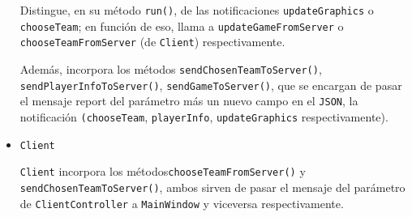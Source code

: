 \documentclass[../DocumentoOficial.tex]{subfiles}
\begin{document}
\begin{sprint}[6]
\begin{itemize}
Distingue, en su método \texttt{run()}, de las notificaciones \texttt{updateGraphics} o \texttt{chooseTeam}; en función de eso, llama a \texttt{updateGameFromServer} o \texttt{chooseTeamFromServer} (de \texttt{Client}) respectivamente.

Además, incorpora los métodos \texttt{sendChosenTeamToServer()}, \texttt{sendPlayerInfoToServer()}, \texttt{sendGameToServer()}, que se encargan de pasar el mensaje report del parámetro más un nuevo campo en el \texttt{JSON}, la notificación \texttt{(chooseTeam}, \texttt{playerInfo}, \texttt{updateGraphics} respectivamente).

\item \texttt{Client}

\texttt{Client} incorpora los métodos\texttt{chooseTeamFromServer()} y \texttt{sendChosenTeamToServer()}, ambos sirven de pasar el mensaje del parámetro de \texttt{ClientController} a \texttt{MainWindow} y viceversa respectivamente.

\end{itemize}

\end{sprint}
\end{document}
